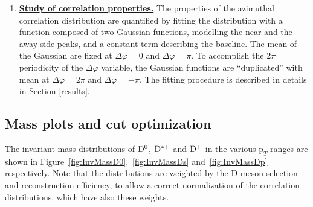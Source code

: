 \begin{enumerate}
\item
\underline{\bf Study of correlation properties.}
The properties of the azimuthal correlation distribution are quantified by
fitting the distribution with a function composed of two Gaussian functions, modelling the near and the away side peaks, and
a constant term describing the baseline. The mean of the Gaussian are fixed at
$\Delta\varphi = 0$ and $\Delta\varphi = \pi$. To accomplish the $2\pi$ periodicity
of the $\Delta\varphi$ variable, the Gaussian functions
are ``duplicated'' with mean at $\Delta\varphi = 2\pi$ and $\Delta\varphi = -\pi$.
The fitting procedure is described in details in Section \ref{results}.



\end{enumerate}

\subsection{Mass plots and cut optimization}
The invariant mass distributions of ${\rm D^0}$, ${\rm D^{*+}}$ and ${\rm D^+}$ in the various $\text{p}_T$ ranges are shown in Figure~\ref{fig:InvMassD0},~\ref{fig:InvMassDs} and~\ref{fig:InvMassDp} respectively. Note that the distributions are weighted by the D-meson selection and reconstruction efficiency, to allow a correct normalization of the correlation distributions, which have also these weights.

